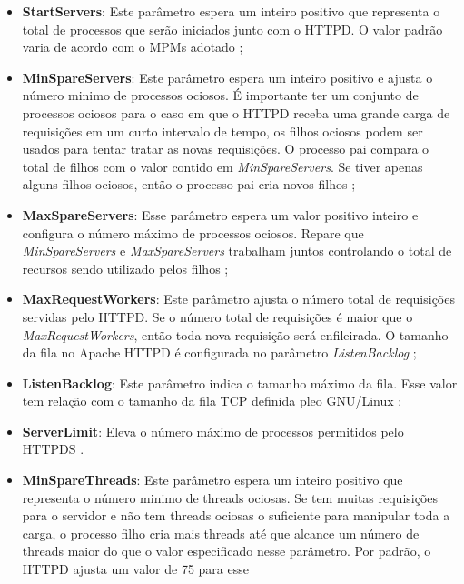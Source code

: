 \begin{itemize}
  \item \textbf{StartServers}: Este parâmetro espera um inteiro positivo que
        representa o total de processos que serão iniciados junto com o HTTPD.
        O valor padrão varia de acordo com o MPMs adotado \cite{mpm_start_server};
  \item \textbf{MinSpareServers}: Este parâmetro espera um inteiro positivo e
        ajusta o número minimo de processos ociosos. É importante ter um
        conjunto de processos ociosos para o caso em que o HTTPD receba uma
        grande carga de requisições em um curto intervalo de tempo, os filhos
        ociosos podem ser usados para tentar tratar as novas requisições. O
        processo pai compara o total de filhos com o valor contido em
        \textit{MinSpareServers}. Se tiver apenas alguns filhos ociosos, então
        o processo pai cria novos filhos \cite{mpm_min_spare};
  \item \textbf{MaxSpareServers}:
        Esse parâmetro espera um valor positivo inteiro e configura o número
        máximo de processos ociosos. Repare que \textit{MinSpareServers} e
        \textit{MaxSpareServers} trabalham juntos controlando o total de
        recursos sendo utilizado pelos filhos \cite{mpm_max_spare};
  \item \textbf{MaxRequestWorkers}: Este parâmetro ajusta o número total de
        requisições servidas pelo HTTPD. Se o número total de requisições é
        maior que o \textit{MaxRequestWorkers}, então toda nova requisição será
        enfileirada. O tamanho da fila no Apache HTTPD é configurada no
        parâmetro \textit{ListenBacklog} \cite{mpm_max_request};
  \item \textbf{ListenBacklog}: Este parâmetro indica o tamanho máximo da fila.
        Esse valor tem relação com o tamanho da fila TCP definida pleo
        GNU/Linux \cite{mpm_listen};
  \item \textbf{ServerLimit}:
        Eleva o número máximo de processos permitidos pelo HTTPDS
        \cite{mpm_server_limit}.
  \item \textbf{MinSpareThreads}: Este parâmetro espera um inteiro positivo que
        representa o número minimo de threads ociosas. Se tem muitas
        requisições para o servidor e não tem threads ociosas o suficiente para
        manipular toda a carga, o processo filho cria mais threads até que
        alcance um número de threads maior do que o valor especificado nesse
        parâmetro.  Por padrão, o HTTPD ajusta um valor de 75 para esse

\end{itemize}
